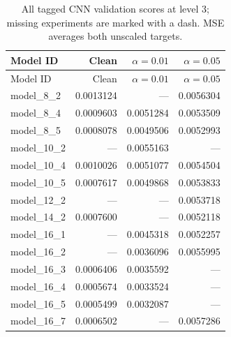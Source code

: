 \begingroup\footnotesize\setlength{\tabcolsep}{3pt}\renewcommand{\arraystretch}{1.05}
\begin{longtable}{lrrr}
\caption{All tagged CNN validation scores at level 3; missing experiments are marked with a dash. MSE averages both unscaled targets.}\label{tab:cnn3}\\
\toprule
Model ID & Clean & $\alpha=0.01$ & $\alpha=0.05$ \\
\midrule
\endfirsthead
\toprule
Model ID & Clean & $\alpha=0.01$ & $\alpha=0.05$ \\
\midrule\endhead
\bottomrule\endfoot
model\_8\_2 & 0.0013124 & --- & 0.0056304 \\
model\_8\_4 & 0.0009603 & 0.0051284 & 0.0053509 \\
model\_8\_5 & 0.0008078 & 0.0049506 & 0.0052993 \\
model\_10\_2 & --- & 0.0055163 & --- \\
model\_10\_4 & 0.0010026 & 0.0051077 & 0.0054504 \\
model\_10\_5 & 0.0007617 & 0.0049868 & 0.0053833 \\
model\_12\_2 & --- & --- & 0.0053718 \\
model\_14\_2 & 0.0007600 & --- & 0.0052118 \\
model\_16\_1 & --- & 0.0045318 & 0.0052257 \\
model\_16\_2 & --- & 0.0036096 & 0.0055995 \\
model\_16\_3 & 0.0006406 & 0.0035592 & --- \\
model\_16\_4 & 0.0005674 & 0.0033524 & --- \\
model\_16\_5 & 0.0005499 & 0.0032087 & --- \\
model\_16\_7 & 0.0006502 & --- & 0.0057286 \\
\end{longtable}\endgroup
